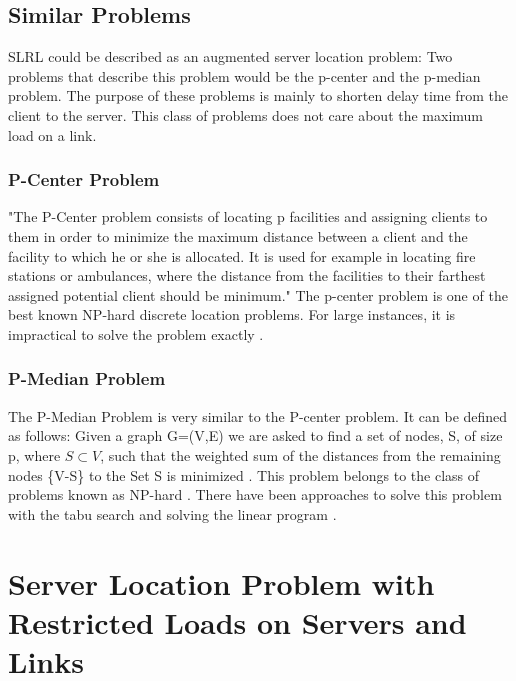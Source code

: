 \documentclass [12pt]{article}
\begin{document}
\subsection {Similar Problems}
SLRL could be described as an augmented server location problem: 
Two problems that describe this problem would be the p-center and the
p-median problem. The purpose of these problems is mainly to shorten delay
time from the client to the server. 
This class of problems does not care about the maximum load on a link.

\subsubsection {P-Center Problem}
"The P-Center problem consists of locating p facilities and assigning clients
to them in order to minimize the maximum distance between a client and the facility
to which he or she is allocated. It is used for example in locating fire stations or ambulances,
where the distance from the facilities 
to their farthest assigned potential client should be minimum."
The p-center problem is one of the best known NP-hard discrete location problems.
For large instances, it is impractical to solve the problem exactly
\cite{KarivHakimi1979}.

\subsubsection {P-Median Problem}
The P-Median Problem is very similar to the P-center problem. It can be defined as follows:
Given a graph G=(V,E) we are asked to find a set of nodes, S, of size p, where $ S\subset V$, such that the weighted
sum of the distances from the remaining nodes \{V-S\} to the Set S is minimized \cite{Rolland1997329}.
This problem belongs to the class of problems known as NP-hard \cite{KarivHakimi1979median}. There have been
approaches to solve this problem with the tabu search \cite{Rolland1997329} and solving the linear program 
\cite{rosing1979p}.


\section{Server Location Problem with Restricted Loads on Servers and Links}
\end{document}
